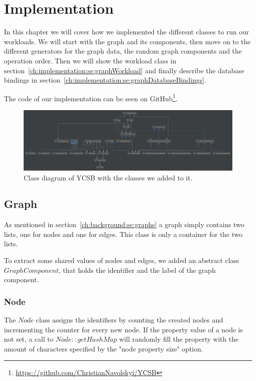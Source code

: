 \chapter{Implementation}
\label{ch:implementation}
In this chapter we will cover how we implemented the different classes to run our workloads.
We will start with the graph and its components,
then move on to the different generators for the graph data,
the random graph components and the operation order.
Then we will show the workload class in section~\ref{ch:implementation:se:graphWorkload} and finally describe the database bindings in section~\ref{ch:implementation:se:graphDatabaseBindings}.

The code of our implementation can be seen on GitHub\footnote{\url{https://github.com/ChristianNavolskyi/YCSB}}.


\begin{figure}
  \includegraphics{images/extendedYCSBWorkflow}
  \caption{Class diagram of YCSB with the classes we added to it. }
  \label{fig:YCSBExtension}
\end{figure}

\section{Graph}
As mentioned in section~\ref{ch:background:se:graphs} a graph simply contains two lists,
one for nodes and one for edges.
This class is only a container for the two lists.

To extract some shared values of nodes and edges,
we added an abstract class $ GraphComponent $,
that holds the identifier and the label of the graph component.

\subsection{Node}
The $ Node $ class assigns the identifiers by counting the created nodes and incrementing the counter for every new node.
If the property value of a node is not set,
a call to $ Node::getHashMap $ will randomly fill the property with the amount of characters specified by the "node property size" option.

